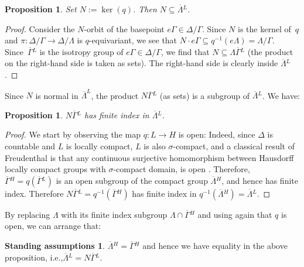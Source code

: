 \documentclass[11pt]{article}
\newcommand{\ie}{i.e.,\xspace}
\numberwithin{equation}{section}\providecommand{\llangle}{\langle\!\langle}\providecommand{\rrangle}{\rangle\!\rangle}\providecommand{\Asterisk}{\ast}
\newcommand{\oGL}{\ensuremath{\overline{\Gamma}{}^L}}
\newcommand{\oGH}{\ensuremath{\overline{\Gamma}{}^H}}
\newcommand{\oLL}{\ensuremath{\overline{\Lambda}{}^L}}
\newcommand{\oLH}{\ensuremath{\overline{\Lambda}{}^H}}
\newtheorem{prop}[thm]{Proposition}
\theoremstyle{definition}
\newtheorem{assume}[thm]{Standing assumptions}
\begin{document}
\begin{prop}\label{prop:NinGamma}
Set $N:=\ker(q)$. Then $N\subseteq \oLL$.
\end{prop}
\begin{proof} Consider the $N$-orbit of the basepoint $e\Gamma\in \Delta / \Gamma$. Since $N$ is the kernel of~$q$ and $\pi:\Delta/\Gamma\to\Delta/\Lambda$ is $q$-equivariant, we see that $N\cdot e\Gamma\subseteq q^{-1}(e\Lambda)=\Lambda / \Gamma$. Since~$\oGL$ is the isotropy group of $e\Gamma\in \Delta / \Gamma$, we find that $N\subseteq \Lambda \oGL$ (the product on the right-hand side is taken as sets). The right-hand side is clearly inside $\oLL$. \end{proof}
Since $N$ is normal in $\overline{\Lambda}^L$, the product $N\oGL$ (as sets) is a subgroup of $\oLL$. We have:
\begin{prop}\label{prop:propbyN}
$N\oGL$ has finite index in $\oLL$.
\end{prop}
\begin{proof} We start by observing the map $q:L\to H$ is open: Indeed, since $\Delta$ is countable and $L$ is locally compact, $L$ is also $\sigma$-compact, and a classical result of Freudenthal is that any continuous surjective homomorphism between Hausdorff locally compact groups with $\sigma$-compact domain, is open \cite[Cor.\,2.D.6]{cornulier-dlh-book}. Therefore, $\oGH=q(\oGL)$ is an open subgroup of the compact group $\oLH$, and hence has finite index. Therefore $N\oGL=q^{-1}(\oGH)$ has finite index in $q^{-1}(\oLH)=\oLL$.\end{proof}

By replacing $\Lambda$ with its finite index subgroup $\Lambda\cap\oGH$ and using again that $q$ is open, we can arrange that:

\begin{assume}\label{assume:oLH=oGH}
$\oLH=\oGH$ and hence we have equality in the above proposition, \ie $\oLL=N\oGL$.
\end{assume}
\end{document}

